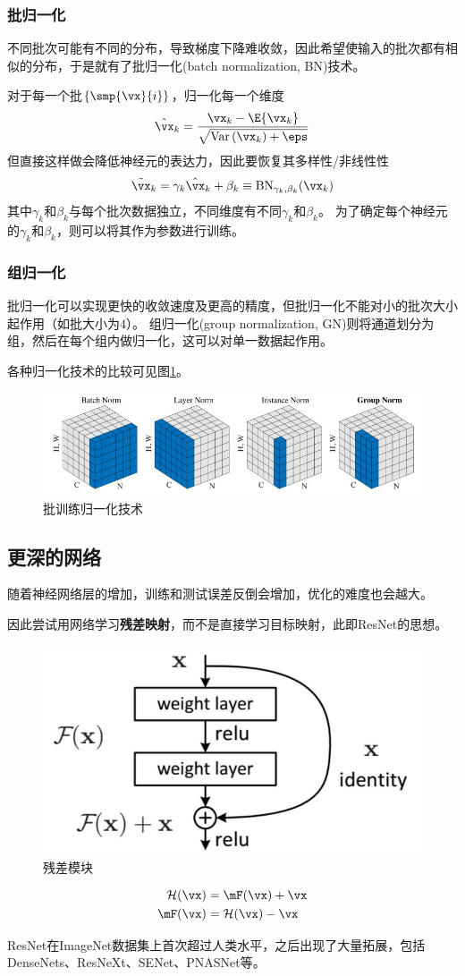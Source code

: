 \subsubsection{批归一化}
不同批次可能有不同的分布，导致梯度下降难收敛，因此希望使输入的批次都有相似的分布，于是就有了批归一化(batch normalization, BN)技术\cite{ioffe:bn_2015}。

对于每一个批$\{\smp{\vx}{i}\}$，归一化每一个维度
\[\hat{\vx}_k=\frac{\vx_k-\E{\vx_k}}{\sqrt{\Var{\vx_k}+\eps}}\]
但直接这样做会降低神经元的表达力，因此要恢复其多样性/非线性性
\[\tilde{\vx}_k=\gamma_k\hat{\vx}_k+\beta_k\equiv \mathrm{BN}_{\gamma_k,\beta_k}(\vx_k)\]
其中$\gamma_k$和$\beta_k$与每个批次数据独立，不同维度有不同$\gamma_k$和$\beta_k$。
为了确定每个神经元的$\gamma_k$和$\beta_k$，则可以将其作为参数进行训练。

\subsubsection{组归一化}
批归一化可以实现更快的收敛速度及更高的精度，但批归一化不能对小的批次大小起作用（如批大小为$4$）。
组归一化(group normalization, GN)\cite{he:gn_2018}则将通道划分为组，然后在每个组内做归一化，这可以对单一数据起作用。

各种归一化技术的比较可见图\ref{fig:normalization}。
\begin{figure}[H]
\centering
\includegraphics[width=0.8\linewidth]{fig/normalization.jpg}
\caption{批训练归一化技术}
\label{fig:normalization}
\end{figure}

\subsection{更深的网络}
随着神经网络层的增加，训练和测试误差反倒会增加\cite{he:identity_resnet_2016}，优化的难度也会越大。

因此尝试用网络学习\textbf{残差映射}，而不是直接学习目标映射，此即ResNet\cite{he:resnet_2016}的思想。
\begin{figure}[H]
\centering
\includegraphics[width=0.5\linewidth]{fig/residual_block.jpg}
\caption{残差模块}
\end{figure}
\[\begin{aligned}
\mathcal{H}(\vx) &= \mF(\vx)+\vx\\
\mF(\vx) &= \mathcal{H}(\vx)-\vx
\end{aligned}\]

ResNet在ImageNet数据集上首次超过人类水平，之后出现了大量拓展，包括DenseNets\cite{huang:densenet_2017}、ResNeXt\cite{xie:resnext_2017}、SENet\cite{hu:senet_2018}、PNASNet\cite{liu:pnasnet}等。